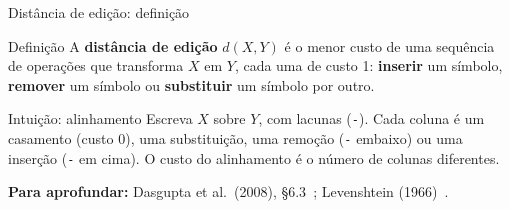 \documentclass[aspectratio=169,xcolor=table]{beamer}
\newcommand{\fonte}[1]{%
  \vfill
  {\tiny\color{gray!55!black}\textbf{Para aprofundar:} #1\par}%
}
\begin{document}
\begin{frame}{Distância de edição: definição}
  \begin{block}{Definição}
    \scriptsize A \textbf{distância de edição} $d(X,Y)$ é o menor custo de uma sequência de
    operações que transforma $X$ em $Y$, cada uma de custo 1: \textbf{inserir} um símbolo,
    \textbf{remover} um símbolo ou \textbf{substituir} um símbolo por outro.
  \end{block}
  \begin{exampleblock}{Intuição: alinhamento}
    \scriptsize Escreva $X$ sobre $Y$, com lacunas (\texttt{-}). Cada coluna é um casamento
    (custo 0), uma substituição, uma remoção (\texttt{-} embaixo) ou uma inserção
    (\texttt{-} em cima). O custo do alinhamento é o número de colunas diferentes.
  \end{exampleblock}
  \begin{center}
  \end{center}
  \fonte{Dasgupta et al.\ (2008), \S 6.3~\cite{dasgupta2008algorithms};
    Levenshtein (1966)~\cite{levenshtein1966binary}.}
\end{frame}
\end{document}

